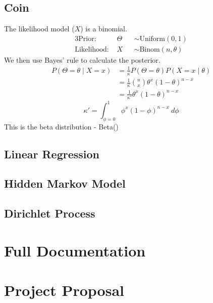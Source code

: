 \documentclass[12pt,notitlepage,a4paper]{report}
\begin{document}
\section{Coin} \label{app:coin}
The likelihood model ($X$) is a binomial.
% 
\begin{alignat*}{3}
	\text{Prior:~}      & \Theta &   & \sim \text{Uniform}(0,1)    \\
	\text{Likelihood:~} & X      &   & \sim \text{Binom}(n,\theta) 
\end{alignat*}
% 
We then use Bayes' rule to calculate the posterior.
\begin{align*}
	P(\Theta=\theta \mid X=x) & = \frac{1}{\kappa}P(\Theta=\theta)P(X=x\mid\theta)     \\ 
	                          & = \frac{1}{\kappa}\binom{n}{x}\theta^x(1-\theta)^{n-x} \\
	                          & = \frac{1}{\kappa'}\theta^x(1-\theta)^{n-x}            
\end{align*}
$$\kappa'=\int_{\phi=0}^1\phi^x(1-\phi)^{n-x}~d\phi$$
This is the beta distribution - Beta()
\section{Linear Regression} \label{app:linreg}
\section{Hidden Markov Model} \label{app:hmm}
\section{Dirichlet Process} \label{app:dp}

\chapter{Full Documentation} \label{app:docs}
% 

\chapter{Project Proposal}

\end{document}
